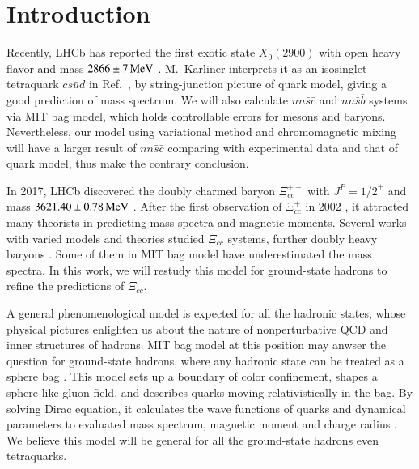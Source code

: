 \documentclass[prd,twocolumn,floatfix,nofootinbib]{revtex4}
\begin{document}
\maketitle\section{Introduction}
Recently, LHCb has reported the first exotic state $X_{0}(2900)$ with open heavy flavor and mass $2866\pm 7\,{\rm MeV}$ \cite{LHCb:2020kd}.
M.~Karliner interprets it as an isosinglet tetraquark $cs\bar{u}\bar{d}$ in Ref.~\cite{Karliner:2020vsi}, by string-junction picture of quark model, giving a good prediction of mass spectrum. 
We will also calculate $nn\bar{s}\bar{c}$ and $nn\bar{s}\bar{b}$ systems via MIT bag model, which holds controllable errors for mesons and baryons.
Nevertheless, our model using variational method and chromomagnetic mixing will have a larger result of $nn\bar{s}\bar{c}$ comparing with experimental data and that of quark model, thus make the contrary conclusion.

In 2017, LHCb discovered the doubly charmed baryon $\Xi_{cc}^{++}$ with $J^{P}={1/2}^{+}$ and mass $3621.40\pm 0.78\,{\rm MeV}$ \cite{Aaij:2017ueg}.
After the first observation of $\Xi_{cc}^{+}$ in 2002 \cite{Moinester:2002uw}, it attracted many theorists in predicting mass spectra and magnetic moments.
Several works with varied models and theories studied $\Xi_{cc}$ systems, further doubly heavy baryons \cite{Fleck:1989mb,Ebert:2004ck,Bernotas:2012nz,He:2004px,Karliner:2014gca,Liu:2018euh}.
Some of them in MIT bag model have underestimated the mass spectra. In this work, we will restudy this model for ground-state hadrons to refine the predictions of $\Xi_{cc}$.

A general phenomenological model is expected for all the hadronic states, whose physical pictures enlighten us about the nature of nonperturbative QCD and inner structures of hadrons.
MIT bag model at this position may anwser the question for ground-state hadrons, where any hadronic state can be treated as a sphere bag \cite{Johnson:1975zp}. 
This model sets up a boundary of color confinement, shapes a sphere-like gluon field, and describes quarks moving relativistically in the bag.
By solving Dirac equation, it calculates the wave functions of quarks and dynamical parameters to evaluated mass spectrum, magnetic moment and charge radius \cite{DeGrand:1975cf}.
We believe this model will be general for all the ground-state hadrons even tetraquarks.
\end{document}
